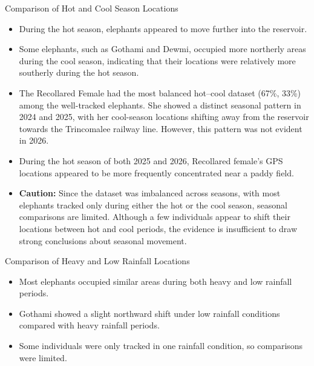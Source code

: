 \documentclass{beamer}
\begin{document}
			
			\begin{frame}{Comparison of Hot and Cool Season Locations}
			\footnotesize
			\begin{itemize}
				\item During the hot season, elephants appeared to move further into the reservoir.
				\item Some elephants, such as Gothami and Dewmi, occupied more northerly areas during the cool season, indicating that their locations were relatively more southerly during the hot season.
				\item The Recollared Female had the most balanced hot–cool dataset (67\%, 33\%) among the well-tracked elephants. She showed a distinct seasonal pattern in 2024 and 2025, with her cool-season locations shifting away from the reservoir towards the Trincomalee railway line. However, this pattern was not evident in 2026.
				\item During the hot season of both 2025 and 2026, Recollared female's GPS locations appeared to be more frequently concentrated near a paddy field.
				\item \textbf{Caution:} Since the dataset was imbalanced across seasons, with most elephants tracked only during either the hot or the cool season, seasonal comparisons are limited. Although a few individuals appear to shift their locations between hot and cool periods, the evidence is insufficient to draw strong conclusions about seasonal movement.
				
			\end{itemize}
		\end{frame}
		
		\begin{frame}{Comparison of Heavy and Low Rainfall Locations}
			\begin{itemize}
				\item Most elephants occupied similar areas during both heavy and low rainfall periods.
				
				\vspace{0.5cm}
				
				\item Gothami showed a slight northward shift under low rainfall conditions compared with heavy rainfall periods.
				
				\vspace{0.5cm}
				
				\item Some individuals were only tracked in one rainfall condition, so
				comparisons were limited.
			\end{itemize}
			\vspace{6pt}
			
		\end{frame}
		
\end{document}
